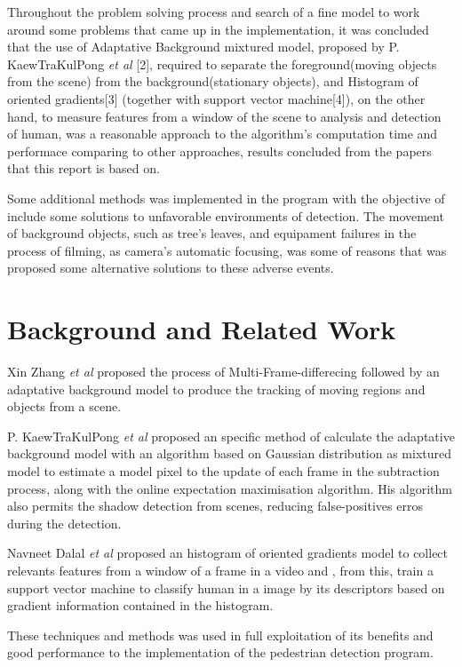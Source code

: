 \documentclass[conference]{IEEEtran}
\begin{document}
	Throughout the problem solving process and search of a fine model to work around some problems that came up in the implementation, it was concluded that the use of Adaptative Background mixtured model, proposed by P. KaewTraKulPong \textit{et al} [2], required to separate the foreground(moving objects from the scene) from the background(stationary objects), and Histogram of oriented gradients[3] (together with support vector machine[4]), on the other hand, to measure features from a window of the scene to analysis and detection of human, was a reasonable approach to the algorithm's computation time and performace comparing to other approaches, results concluded from the papers that this report is based on. 
	
	Some additional methods was implemented in the program with the objective of include some solutions to unfavorable environments of detection. The movement of background objects, such as tree's leaves, and equipament failures in the process of filming, as camera's automatic focusing, was some of reasons that was proposed some alternative solutions to these adverse events.

\section{Background and Related Work}

	Xin Zhang \textit{et al} proposed the process of Multi-Frame-differecing followed by an adaptative background model to produce the tracking of moving regions and objects from a scene. 
	
	P. KaewTraKulPong \textit{et al} proposed an specific method of calculate the adaptative background model with an algorithm based on Gaussian distribution as mixtured model to estimate a model pixel to the update of each frame in the subtraction process, along with
the online expectation maximisation algorithm. His algorithm also permits the shadow detection from scenes, reducing false-positives erros during the detection.

	Navneet Dalal \textit{et al} proposed an histogram of oriented gradients model to collect relevants features from a window of a frame in a video and , from this, train a support vector machine to classify human in a image by its descriptors based on gradient information contained in the histogram.
	
	These techniques and methods was used in full exploitation of its benefits and good performance to the implementation of the pedestrian detection program. 
\end{document}
